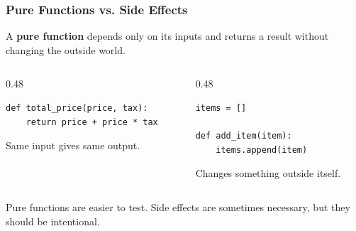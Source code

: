 \documentclass[aspectratio=169,10pt]{beamer}
\newcommand{\keyword}[1]{\textcolor{PrimaryBlue}{\textbf{#1}}}
\begin{document}
\begin{frame}[fragile]
\frametitle{Pure Functions vs. Side Effects}
\small
A \keyword{pure function} depends only on its inputs and returns a result without changing the outside world.

\vspace{0.1cm}
\begin{columns}[T,totalwidth=0.96\textwidth]
\begin{column}{0.48\textwidth}
\begin{tcolorbox}[lecturebox,title=Pure function]
\begin{lstlisting}[style=pycodesmall]
def total_price(price, tax):
    return price + price * tax
\end{lstlisting}
Same input gives same output.
\end{tcolorbox}
\end{column}
\begin{column}{0.48\textwidth}
\begin{tcolorbox}[lecturebox,title=Side effect]
\begin{lstlisting}[style=pycodesmall]
items = []

def add_item(item):
    items.append(item)
\end{lstlisting}
Changes something outside itself.
\end{tcolorbox}
\end{column}
\end{columns}
\vspace{0.15cm}
\begin{tcolorbox}[lecturebox,title=Why this matters]
Pure functions are easier to test. Side effects are sometimes necessary, but they should be intentional.
\end{tcolorbox}
\end{frame}
\end{document}
